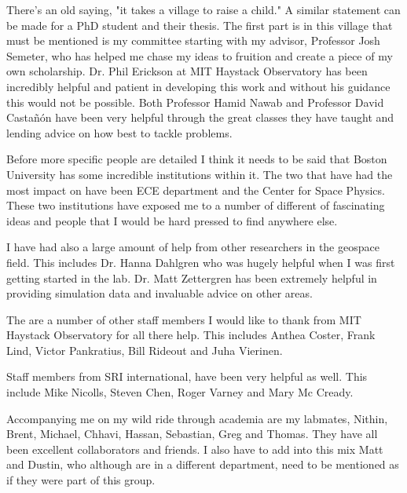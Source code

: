 There's an old saying, "it takes a village to raise a child." A similar statement can be made for a PhD student and their thesis. The first part is in this village that must be mentioned is my committee starting with my advisor, Professor Josh Semeter, who has helped me chase my ideas to fruition and create a piece of my own scholarship. Dr. Phil Erickson at MIT Haystack Observatory has been incredibly helpful and patient in developing this work and without his guidance this would not be possible. Both Professor Hamid Nawab and Professor David Castañón have been very helpful through the great classes they have taught and lending advice on how best to tackle problems.

Before more specific people are detailed I think it needs to be said that Boston University has some incredible institutions within it. The two that have had the most impact on have been ECE department and the Center for Space Physics. These two institutions have exposed me to a number of different of fascinating ideas and people that I would be hard pressed to find anywhere else.

I have had also a large amount of help from other researchers in the geospace field. This includes Dr. Hanna Dahlgren who was hugely helpful when I was first getting started in the lab. Dr. Matt Zettergren has been extremely helpful in providing simulation data and invaluable advice on other areas.

The are a number of other staff members I would like to thank from MIT Haystack Observatory for all there help. This includes Anthea Coster, Frank Lind, Victor Pankratius, Bill Rideout and Juha Vierinen. 

Staff members from SRI international, have been very helpful as well. This include Mike Nicolls, Steven Chen, Roger Varney and Mary Mc Cready.
 
Accompanying me on my wild ride through academia are my labmates, Nithin, Brent, Michael, Chhavi, Hassan, Sebastian, Greg and Thomas. They have all been excellent collaborators and friends. I also have to add into this mix Matt and Dustin, who although are in a different department, need to be mentioned as if they were part of this group.



\vskip 1in

\noindent
